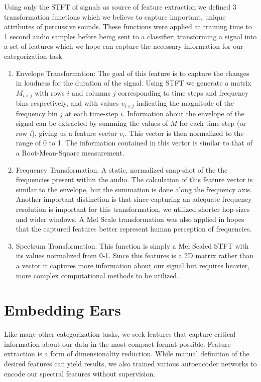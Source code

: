 \documentclass[\main/thesis.tex]{subfiles}
\begin{document}
Using only the STFT of signals as source of feature extraction we defined 3 transformation functions which we believe to capture important, unique attributes of percussive sounds.  These functions were applied at training time to 1 second audio samples before being sent to a classifier; transforming a signal into a set of features which we hope can capture the necessary information for our categorization task. 


\begin{enumerate}
\item Envelope Transformation: The goal of this feature is to capture the changes in loudness for the duration of the signal. Using STFT we generate a matrix $M_{i \times j}$ with rows $i$ and columns $j$ corresponding to time steps and frequency bins respectively, and with values $v_{i \times j}$ indicating the magnitude of the frequency bin $j$ at each time-step $i$. Information about the envelope of the signal can be extracted by summing the values of $M$ for each time-step (or row $i$), giving us a feature vector $v_i$. This vector is then normalized to the range of 0 to 1. The information contained in this vector is similar to that of a Root-Mean-Square measurement.
\item Frequency Transformation: A static, normalized snap-shot of the the frequencies present within the audio. The calculation of this feature vector is similar to the envelope, but the summation is done along the frequency axis. Another important distinction is that since capturing an adequate frequency resolution is important for this transformation, we utilized shorter hop-sizes and wider windows. A Mel Scale transformation was also applied in hopes that the captured features better represent human perception of frequencies. 
\item Spectrum Transformation: This function is simply a Mel Scaled STFT with its values normalized from 0-1. Since this features is a 2D matrix rather than a vector it captures more information about our signal but requires heavier, more complex computational methods to be utilized. 
\end{enumerate}


\section{Embedding Ears}
% 
Like many other categorization tasks, we seek features that capture critical information about our data in the most compact format possible. Feature extraction is a form of dimensionality reduction. While manual definition of the desired features can yield results, we also trained various autoencoder networks to encode our spectral features without supervision. 
\end{document}
